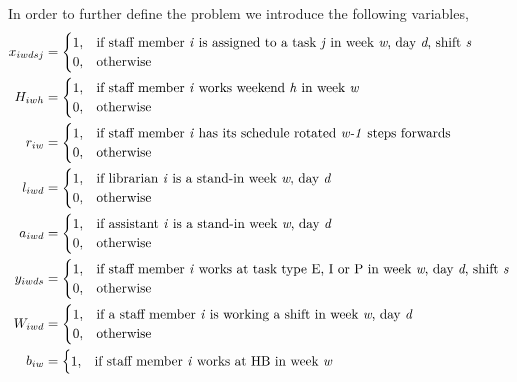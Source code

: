 In order to further define the problem we introduce the following variables,
\begin{align}
    x_{iwdsj}&=
    \begin{cases}
      1, & \text{if staff member \textit{i} is assigned to a task \textit{j} in week \textit{w}, day \textit{d}, shift \textit{s}}\\
      0, & \text{otherwise}
    \end{cases}
    \\
    H_{iwh}&=
    \begin{cases}
      1, & \text{if staff member \textit{i} works weekend \textit{h} in week \textit{w}}\\
      0, & \text{otherwise}
    \end{cases}
	\\
	r_{iw}&=
	\begin{cases}
		1, & \text{if staff member \textit{i} has its schedule rotated \textit{w-1} steps forwards}\\
		0, & \text{otherwise}
	\end{cases}
	\\
	l_{iwd}&=
	\begin{cases}
	  1, & \text{if librarian \textit{i} is a stand-in week \textit{w}, day \textit{d}} \\
	  0, & \text{otherwise}
	\end{cases}
	\\
	a_{iwd}&=
	\begin{cases}
 		1, & \text{if assistant \textit{i} is a stand-in week \textit{w}, day \textit{d}} \\
 		0, & \text{otherwise}
	\end{cases}
	\\
	y_{iwds}&=
	\begin{cases}
 		1, & \text{if staff member \textit{i} works at task type E, I or P in week \textit{w}, day \textit{d}, shift \textit{s}} \\
 		0, & \text{otherwise}
	\end{cases}
	\\
	W_{iwd}&=
	\begin{cases}
	 	1, & \text{if a staff member \textit{i} is working a shift in week \textit{w}, day \textit{d}} \\
	 	0, & \text{otherwise}
	\end{cases}
	\\
	b_{iw}&=
	\begin{cases}
 		1, & \text{if staff member \textit{i} works at HB in week \textit{w}} \\

\end{cases}
\end{align}
